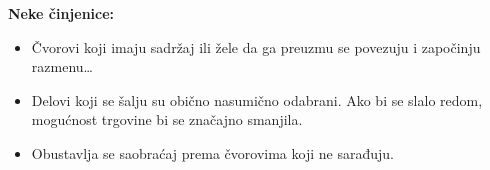 \documentclass[a4paper]{article}
\begin{document}
        \noindent \textbf{Neke činjenice:}
        \begin{itemize}
            \item Čvorovi koji imaju sadržaj ili žele da ga preuzmu se povezuju i započinju 
                  razmenu\dots
            \item Delovi koji se šalju su obično nasumično odabrani. Ako bi se slalo redom,
                  mogućnost trgovine bi se značajno smanjila.
            \item Obustavlja se saobraćaj prema čvorovima koji ne sarađuju.
        \end{itemize}



\newpage
        
\appendix
\end{document}
